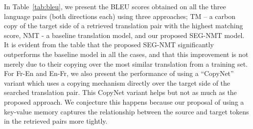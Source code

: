 In Table~\ref{tab:bleu}, we present the BLEU scores obtained on all the three language pairs (both directions each) using three approaches; TM -- a carbon copy of the target side of a retrieved translation pair with the highest matching score, NMT - a baseline translation model, and our proposed SEG-NMT model. It is evident from the table that the proposed SEG-NMT significantly outperforms the baseline model in all the cases, and that this improvement is not merely due to their copying over the most similar translation from a training set. For Fr-En and En-Fr, we also present the performance of using a ``CopyNet''~\citep{gu2016incorporating} variant which uses a copying mechanism directly over the target side of the searched translation pair. This CopyNet variant helps but not as much as the proposed approach. We conjecture this happens because our proposal of using a key-value memory captures the relationship between the source and target tokens in the retrieved pairs more tightly.


\vspace{-7pt}
